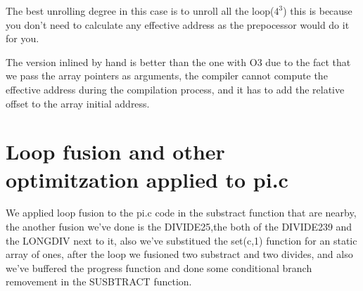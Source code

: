 \documentclass[10pt,a4paper]{article}
\begin{document}
The best unrolling degree in this case is to unroll all the loop($4^3$) this is because you don't need to calculate any effective address as the prepocessor would do it for you.

The version inlined by hand is better than the one with O3 due to the fact that we pass the array pointers as arguments, the compiler cannot compute the effective address during the compilation process, and it has to add the relative offset to the array initial address.

\section{Loop fusion and other optimitzation applied to pi.c}
We applied loop fusion to the pi.c code in the substract function that are nearby, the another fusion we've done is the DIVIDE25,the both of the DIVIDE239 and the LONGDIV next to it, also we've substitued the set(c,1) function for an static array of ones, after the loop we fusioned two substract and two divides, and also we've buffered the progress function and done some conditional branch removement in the SUSBTRACT function.
\end{document}
